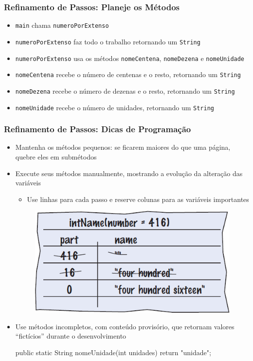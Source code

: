 \documentclass[xcolor={dvipsnames,table},aspectratio=169]{beamer}
\begin{document}
\begin{frame}\frametitle{Refinamento de Passos: Planeje os Métodos}
\begin{itemize}
	\item \texttt{main} chama \texttt{numeroPorExtenso}
	\item \texttt{numeroPorExtenso} faz todo o trabalho retornando um \texttt{String}
	\item \texttt{numeroPorExtenso} usa os métodos \texttt{nomeCentena}, \texttt{nomeDezena} e \texttt{nomeUnidade}
	\item \texttt{nomeCentena} recebe o número de centenas e o resto, retornando um \texttt{String}
	\item \texttt{nomeDezena} recebe o número de dezenas e o resto, retornando um \texttt{String}
	\item \texttt{nomeUnidade} recebe o número de unidades, retornando um \texttt{String}
\end{itemize}
\end{frame}

\begin{frame}[fragile]\frametitle{Refinamento de Passos: Dicas de Programação}
\begin{itemize}
	\item Mantenha os métodos pequenos: se ficarem maiores do que uma página, quebre eles em submétodos
	\item Execute seus métodos manualmente, mostrando a evolução da alteração das variáveis
	\begin{itemize}
		\item Use linhas para cada passo e reserve colunas para as variáveis importantes 
	\end{itemize}
\begin{figure}[h]
	\includegraphics[height=0.15\paperheight,center]{pucrs-ep-fprog-unidade_05-metodos-laminas-teste_de_mesa.png}
\end{figure}
	\item Use métodos incompletos, com conteúdo provisório, que retornam valores ``fictícios'' durante o desenvolvimento
\begin{javacode}
public static String nomeUnidade(int unidades) {
   return "unidade";
}
\end{javacode}
\end{itemize}
\end{frame}
\end{document}
